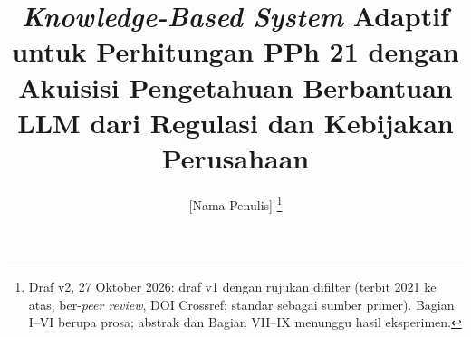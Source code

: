 \documentclass[journal,a4paper]{IEEEtran}
\newcommand{\en}[1]{\textit{#1}}
\begin{document}
\title{\en{Knowledge-Based System} Adaptif untuk Perhitungan PPh 21 dengan Akuisisi Pengetahuan Berbantuan LLM dari Regulasi dan Kebijakan Perusahaan}
\author{[Nama Penulis]%
\thanks{Draf v2, 27 Oktober 2026: draf v1 dengan rujukan difilter (terbit 2021 ke atas, ber-\en{peer review}, DOI Crossref; standar sebagai sumber primer). Bagian I--VI berupa prosa; abstrak dan Bagian VII--IX menunggu hasil eksperimen.}}
\maketitle














\end{document}
